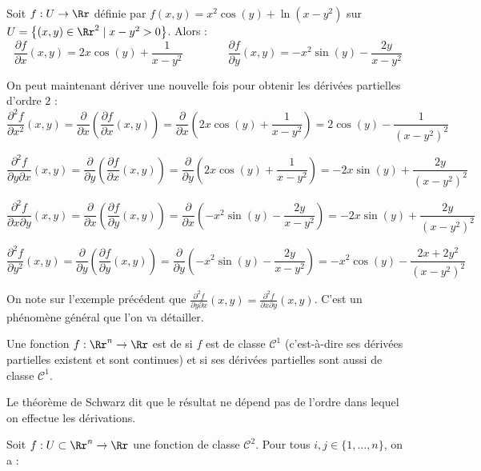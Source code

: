 \documentclass[11pt, class=report,crop=false]{standalone}
\begin{document}
\begin{exemple}
Soit $f : U \to \Rr$ définie par $f(x,y) = x^2\cos(y) + \ln(x-y^2)$ sur $U = \big\{ (x,y) \in \Rr^2 \mid x-y^2>0 \big\}$.
Alors :
$$\frac{\partial f}{\partial x}(x,y) = 2x\cos(y) + \frac{1}{x-y^2}
\qquad\qquad
\frac{\partial f}{\partial y}(x,y) = -x^2\sin(y) - \frac{2y}{x-y^2}$$

On peut maintenant dériver une nouvelle fois pour obtenir les dérivées partielles d'ordre $2$ :
$$\frac{\partial ^2 f}{\partial x^2}(x,y) 
= \frac{\partial}{\partial x}\left(\frac{\partial f}{\partial x}(x,y)\right)
= \frac{\partial}{\partial x}\left(2x\cos(y) + \frac{1}{x-y^2}\right)
= 2\cos(y) - \frac{1}{(x-y^2)^2}$$

$$\frac{\partial ^2 f}{\partial y\partial x}(x,y) 
= \frac{\partial}{\partial y}\left(\frac{\partial f}{\partial x}(x,y)\right)
= \frac{\partial}{\partial y}\left(2x\cos(y) + \frac{1}{x-y^2}\right)
= \boxed{-2x\sin(y) + \frac{2y}{(x-y^2)^2}}$$

$$\frac{\partial ^2 f}{\partial x\partial y}(x,y) 
= \frac{\partial}{\partial x}\left(\frac{\partial f}{\partial y}(x,y)\right)
= \frac{\partial}{\partial x}\left(-x^2\sin(y) - \frac{2y}{x-y^2}\right)
= \boxed{-2x\sin(y) + \frac{2y}{(x-y^2)^2}}$$

$$\frac{\partial ^2 f}{\partial y^2}(x,y) 
= \frac{\partial}{\partial y}\left(\frac{\partial f}{\partial y}(x,y)\right)
= \frac{\partial}{\partial y}\left(-x^2\sin(y) - \frac{2y}{x-y^2}\right)
= -x^2\cos(y) - \frac{2x+2y^2}{(x-y^2)^2}$$


\end{exemple}

On note sur l'exemple précédent que $\frac{\partial ^2 f}{\partial y\partial x}(x,y) = \frac{\partial ^2 f}{\partial x\partial y}(x,y)$. C'est un phénomène général que l'on va détailler.


\begin{definition}
    Une fonction $f : \Rr^n \to \Rr$ est de  si $f$ est de classe $\mathcal{C}^1$ (c'est-à-dire ses dérivées partielles existent et sont continues) et si ses dérivées partielles sont aussi de classe $\mathcal{C}^1$.
\end{definition}

Le théorème de Schwarz dit que le résultat ne dépend pas de l'ordre dans lequel on effectue les dérivations.
\begin{theoreme}
Soit $f:U\subset \Rr^n\to \Rr$ une fonction de classe $\mathcal{C}^2$. 
Pour tous $i,j  \in \{1,\dots ,n\}$, on a :
\end{theoreme}
\end{document}
